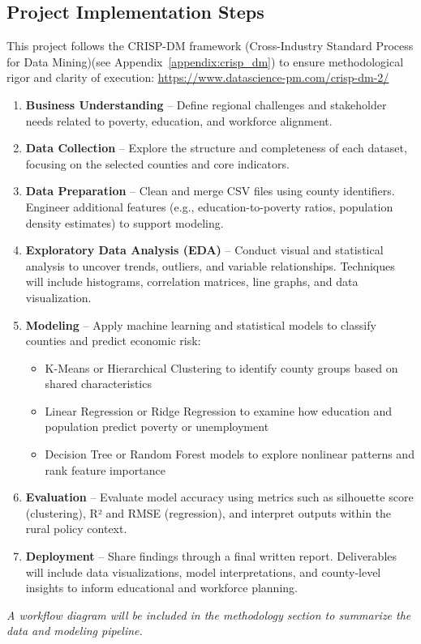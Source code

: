 \documentclass{llncs}
\begin{document}
\subsection{Project Implementation Steps}
This project follows the CRISP-DM framework (Cross-Industry Standard Process for Data Mining)(see Appendix~\ref{appendix:crisp_dm}) to ensure methodological rigor and clarity of execution:
\href{https://www.datascience-pm.com/crisp-dm-2/}{https://www.datascience-pm.com/crisp-dm-2/}
\begin{enumerate}
    \item \textbf{Business Understanding} – Define regional challenges and stakeholder needs related to poverty, education, and workforce alignment.
    \item \textbf{Data Collection} – Explore the structure and completeness of each dataset, focusing on the selected counties and core indicators. 
    \item \textbf{Data Preparation} – Clean and merge CSV files using county identifiers. Engineer additional features (e.g., education-to-poverty ratios, population density estimates) to support modeling.
    \item \textbf{Exploratory Data Analysis (EDA)} – Conduct visual and statistical analysis to uncover trends, outliers, and variable relationships. Techniques will include histograms, correlation matrices, line graphs, and data visualization.
    \item \textbf{Modeling} – Apply machine learning and statistical models to classify counties and predict economic risk:
    \begin{itemize}
        \item K-Means or Hierarchical Clustering to identify county groups based on shared characteristics
        \item Linear Regression or Ridge Regression to examine how education and population predict poverty or unemployment
        \item Decision Tree or Random Forest models to explore nonlinear patterns and rank feature importance
    \end{itemize}
    \item \textbf{Evaluation} – Evaluate model accuracy using metrics such as silhouette score (clustering), R² and RMSE (regression), and interpret outputs within the rural policy context.
    \item \textbf{Deployment} – Share findings through a final written report. Deliverables will include data visualizations, model interpretations, and county-level insights to inform educational and workforce planning.
\end{enumerate}
\textit{A workflow diagram will be included in the methodology section to summarize the data and modeling pipeline.}
\end{document}

